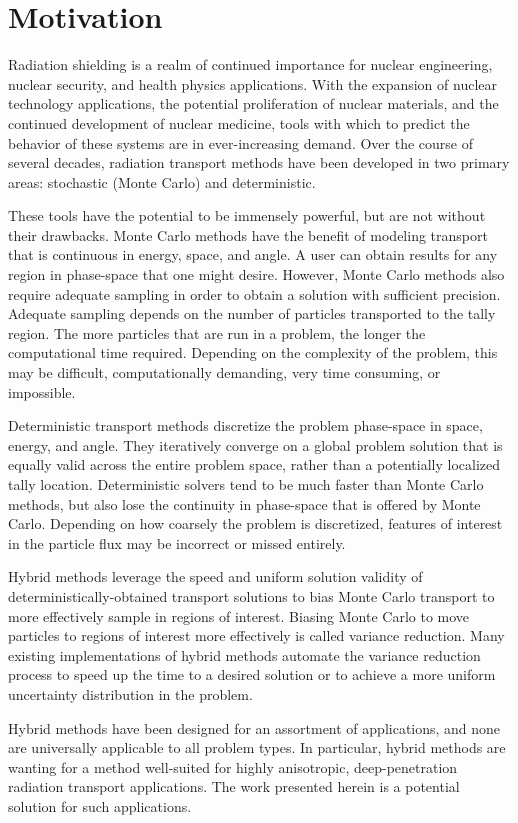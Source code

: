 \section{Motivation}
\label{sec:motivation}

Radiation shielding is a realm of continued importance for nuclear engineering,
nuclear security, and health physics applications.
With the expansion of nuclear technology
applications,
the potential proliferation of nuclear materials, and the continued development of
nuclear medicine, tools with which to predict the behavior
of these systems are
in ever-increasing demand. Over the course of several decades, radiation
transport methods have been developed in two primary areas: stochastic (Monte
Carlo) and
deterministic.

These tools have the potential to be immensely
powerful, but are not without their drawbacks. Monte Carlo methods have the
benefit of modeling transport that is continuous in energy, space, and angle.
A user can obtain results for any region in phase-space that one might desire.
However, Monte Carlo methods also require adequate sampling in order to obtain a
solution with sufficient precision. Adequate sampling depends on the number of
particles transported to the tally region. The more particles that are run in a
problem, the
longer the computational time required. Depending on the complexity of the problem,
this may be difficult, computationally demanding, very time consuming,
or impossible.

Deterministic
transport methods discretize the problem phase-space in space, energy, and
angle. They iteratively converge on a global problem solution that is equally
valid across the entire problem space, rather than a potentially localized tally
location. Deterministic solvers tend to be much faster
than Monte Carlo methods, but also lose
the continuity in phase-space that is offered by Monte Carlo. Depending on how
coarsely the problem is discretized, features of interest in the particle flux may
be incorrect or missed entirely.

Hybrid methods leverage the speed and uniform solution validity of
deterministically-obtained transport solutions to bias Monte Carlo transport to
more effectively sample in regions of interest. Biasing Monte Carlo to move
particles to regions of interest more effectively
is called variance reduction. Many existing
implementations of hybrid methods
automate the variance reduction process to speed up the time to a
desired solution or to achieve a more uniform uncertainty distribution in the
problem.

Hybrid methods have been designed for an assortment of applications, and none are
universally applicable to all problem types. In particular, hybrid methods are
wanting for a method well-suited for
highly anisotropic, deep-penetration radiation transport applications. The work
presented herein is a potential solution for such applications.
